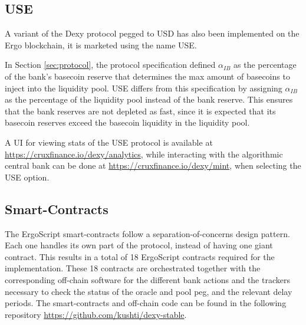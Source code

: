 \documentclass{ifcolog}
\newcommand{\dxusd}{USE}
\begin{document}
\subsection{\dxusd}
\label{subsec:dexyusd}

A variant of the Dexy protocol pegged to USD has also been implemented on the Ergo blockchain, it is marketed using the name USE.

In Section \ref{sec:protocol}, the protocol specification defined $\alpha_{IB}$ as the percentage of the bank's basecoin reserve
that determines the max amount of basecoins to inject into the liquidity pool. USE differs from this specification 
by assigning $\alpha_{IB}$ as the percentage of the liquidity pool instead of the bank reserve. 
This ensures that the bank reserves are not depleted as fast, since it is expected that its basecoin reserves exceed 
the basecoin liquidity in the liquidity pool.

A UI for viewing stats of the \dxusd{} protocol is available at \url{https://cruxfinance.io/dexy/analytics}, 
while interacting with the algorithmic central bank can be done at \url{https://cruxfinance.io/dexy/mint}, 
when selecting the USE option.

\subsection{Smart-Contracts}
\label{subsec:smartcontracts}
The ErgoScript smart-contracts follow a separation-of-concerns design pattern. Each one handles its own part of the protocol, 
instead of having one giant contract. This results in a total of 18 ErgoScript contracts required for the implementation. 
These 18 contracts are orchestrated together with the corresponding off-chain software for the different bank actions and
the trackers necessary to check the status of the oracle and pool peg, and the relevant delay periods.
The smart-contracts and off-chain code can be found in the following repository \url{https://github.com/kushti/dexy-stable}. 




\end{document}
